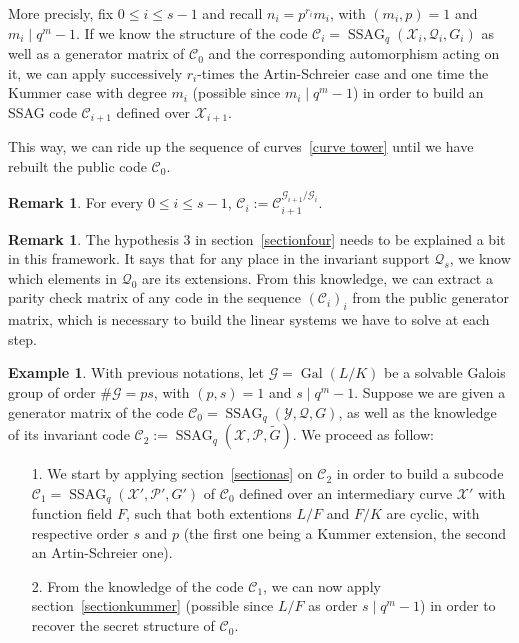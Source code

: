 \documentclass[10pt]{article}
\theoremstyle{definition}
\newtheorem{rq1}[thm]{Remark}
\theoremstyle{definition}
\newtheorem{expl}[thm]{Example}
\theoremstyle{definition}
\newcommand{\C}{\mathcal{C}}
\newcommand{\X}{\mathcal{X}}
\newcommand{\Y}{\mathcal{Y}}
\newcommand{\PR}{\mathcal{P}}
\newcommand{\QR}{\mathcal{Q}}
\newcommand{\G}{\mathcal{G}}
\newcommand{\Gal}{\operatorname{Gal}}
\newcommand{\ssag}{\operatorname{SSAG}}
\begin{document}
 \noindent More precisly, fix $0 \leq i \leq s-1$ and recall $n_i = p^{r_i}m_i$, with $(m_i,p)=1$ and $m_i \mid q^m-1$. If we know the structure of the code $\C_i = \ssag_q(\X_i,\QR_i,G_i)$ as well as a generator matrix of $\C_0$ and the corresponding automorphism acting on it, we can apply successively $r_i$-times the Artin-Schreier case and one time the Kummer case with degree $m_i$ (possible since $m_i \mid q^m-1$) in order to build an SSAG code $\C_{i+1}$ defined over $\X_{i+1}$. 

\noindent This way, we can ride up the sequence of curves~\eqref{curve tower} until we have rebuilt the public code $\C_0$. 

\begin{rq1}
For every $0 \leq i \leq s-1$, $\C_i := \C_{i+1}^{\G_{i+1}/\G_i}$. 
\end{rq1}

\begin{rq1} \label{induced permutation} The hypothesis 3 in section~\ref{sectionfour} needs to be explained a bit in this framework. It says that for any place in the invariant support $\QR_s$, we know which elements in $\QR_0$ are its extensions. From this knowledge, we can extract a parity check matrix of any code in the sequence $(\C_i)_i$ from the public generator matrix, which is necessary to build the linear systems we have to solve at each step. 
\end{rq1}

\begin{expl} With previous notations, let $\G=\Gal(L/K)$ be a solvable Galois group of order $\#\G = ps$, with $(p,s)=1$ and $s \mid q^m-1$. Suppose we are given a generator matrix of the code $\C_0 = \ssag_q(\Y,\QR,G)$, as well as the knowledge of its invariant code $\C_2 := \ssag_q(\X,\PR,\tilde{G})$. We proceed as follow: 
\begin{enumerate}
\item[1.] We start by applying section~\ref{sectionas} on $\C_2$ in order to build a subcode $\C_1 = \ssag_q(\X',\PR',G')$ of $\C_0$ defined over an intermediary curve $\X'$ with function field $F$, such that both extentions $L/F$ and $F/K$ are cyclic, with respective order $s$ and $p$ (the first one being a Kummer extension, the second an Artin-Schreier one).
\item[2.] From the knowledge of the code $\C_1$, we can now apply section~\ref{sectionkummer} (possible since $L/F$ as order $s \mid q^m-1$) in order to recover the secret structure of $\C_0$.
\end{enumerate}
\end{expl}
\end{document}
